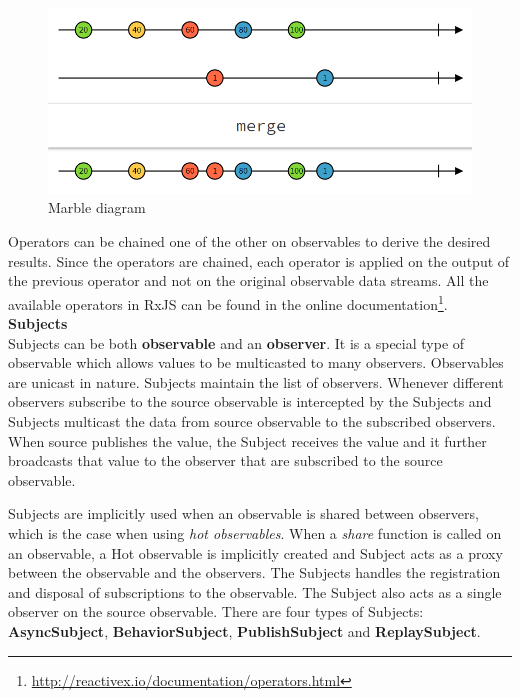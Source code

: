 \begin{figure}[!h]
	\centering
	\includegraphics[scale=0.5,trim=0 0 0 0]{images/operator-marble-diagram.png}
	\caption{Marble diagram}
	\label{fig:operator-marble-diagram}
\end{figure}

Operators can be chained one of the other on observables to derive the desired results. Since the operators are chained, each operator is applied on the output of the previous operator and not on the original observable data streams. All the available operators in RxJS can be found in the online documentation\footnote{\url{http://reactivex.io/documentation/operators.html}}.
\\
\textbf{Subjects}
\\
Subjects can be both \textbf{observable} and an \textbf{observer}\cite{reactiveSubjects}. It is a special type of observable which allows values to be multicasted to many observers. Observables are unicast in nature. Subjects maintain the list of observers. Whenever different observers subscribe to the source observable is intercepted by the Subjects and Subjects multicast the data from source observable to the subscribed observers. When source publishes the value, the Subject receives the value and it further broadcasts that value to the observer that are subscribed to the source observable. 


Subjects are implicitly used when an observable is shared between observers, which is the case when using \textit{hot observables}. When a \textit{share} function is called on an observable, a Hot observable is implicitly created and Subject acts as a proxy between the observable and the observers. The Subjects handles the registration and disposal of subscriptions to the observable. The Subject also acts as a single observer on the source observable. There are four types of Subjects: \textbf{AsyncSubject}, \textbf{BehaviorSubject}, \textbf{PublishSubject} and \textbf{ReplaySubject}.

